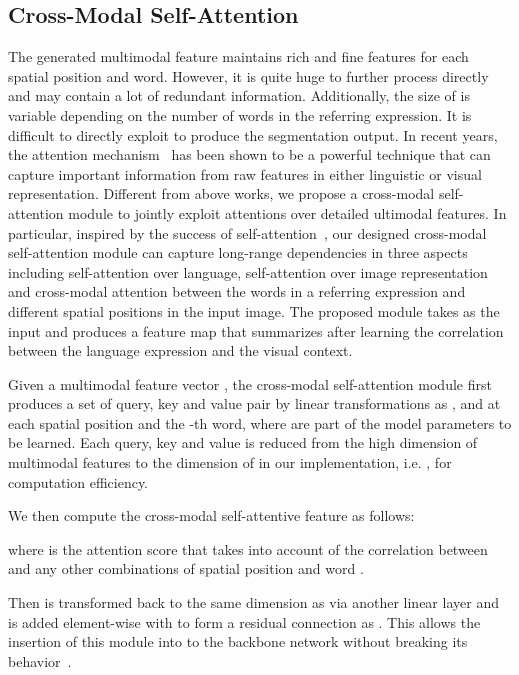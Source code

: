 \subsection{Cross-Modal Self-Attention}\label{sec:msa}
The generated multimodal feature  maintains rich and fine features for each spatial position and word. However, it is quite huge to further process directly and may contain a lot of redundant information. Additionally, the size of  is variable depending on the number of words in the referring expression. It is difficult to directly exploit  to produce the segmentation output. In recent years, the attention mechanism~\cite{hu2017modeling,shi2018key,vaswani2017attention,xu2015show,yu2018mattnet} has been shown to be a powerful technique that can capture important information from raw features in either linguistic or visual representation. Different from above works, we propose a cross-modal self-attention module to jointly exploit attentions over detailed ultimodal features. In particular, inspired by the success of self-attention~\cite{vaswani2017attention,wang2018non}, our designed cross-modal self-attention module can capture long-range dependencies in three aspects including self-attention over language, self-attention over image representation and cross-modal attention between the words in a referring expression and different spatial positions in the input image. The proposed module takes  as the input and produces a feature map that summarizes  after learning the correlation between the language expression and the visual context. 
 
 



Given a multimodal feature vector , the cross-modal self-attention module first produces a set of query, key and value pair by linear transformations as  ,  and   at each spatial position  and the -th word, where  are part of the model parameters to be learned. Each query, key and value is reduced from the high dimension of multimodal features to the dimension of  in our implementation, i.e. , for computation efficiency.

We then compute the cross-modal self-attentive feature  as follows: 

where  is the attention score that takes into account of the correlation between  and any other combinations of spatial position and word .

Then  is transformed back to the same dimension as  via another linear layer and is added element-wise with  to form a residual connection as . This allows the insertion of this module into to the backbone network without breaking its behavior~\cite{he2016deep}. 



